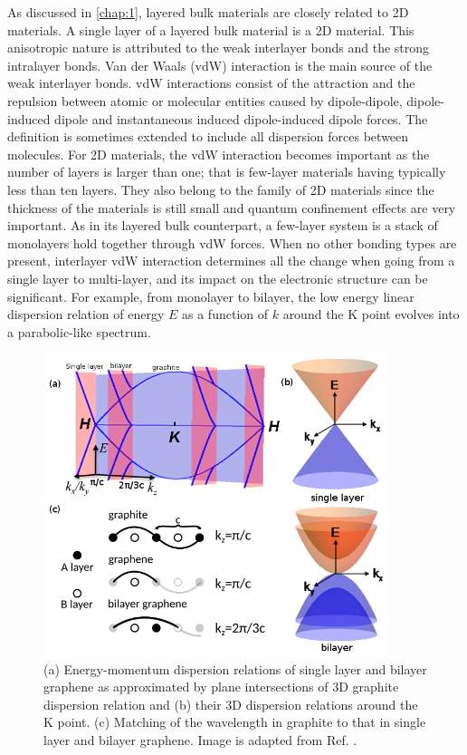 As discussed in \autoref{chap:1}, layered bulk materials are closely related to 2D materials. A single layer of a layered bulk material is a 2D material. This anisotropic nature is attributed to the weak interlayer bonds and the strong intralayer bonds. Van der Waals (vdW) interaction \cite{vdws} is the main source of the weak interlayer bonds. vdW interactions consist of the attraction and the repulsion between atomic or molecular entities caused by dipole-dipole, dipole-induced dipole and instantaneous induced dipole-induced dipole forces. The definition is sometimes extended to include all dispersion forces between molecules.  For 2D materials, the vdW interaction becomes important as the number of layers is larger than one; that is few-layer materials having typically less than ten layers. They also belong to the family of 2D materials since the thickness of the materials is still small and quantum confinement effects are very important. As in its layered bulk counterpart, a few-layer system is a stack of monolayers hold together through vdW forces. When no other bonding types are present, interlayer vdW interaction determines all the change when going from a single layer to multi-layer, and its impact on the electronic structure can be significant. For example, from monolayer to bilayer, the low energy linear dispersion relation of energy $E$ as a function of $k$ around the $\mathrm{K}$ point evolves into a parabolic-like spectrum\cite{Partoens2006,Mak2010a}. 

\begin{figure}[ht] 
\centering  
\includegraphics[width=0.9\textwidth]{gra_band.png}
\caption{(a) Energy-momentum dispersion relations of single layer and bilayer graphene as approximated by plane intersections of 3D graphite dispersion relation and (b) their 3D dispersion relations around the $\mathrm{K}$ point. (c) Matching of the wavelength in graphite to that in single layer and bilayer graphene. Image is adapted from Ref. \cite{Mak2010a}. }  
\label{fig:gra_bands}
\end{figure} 

